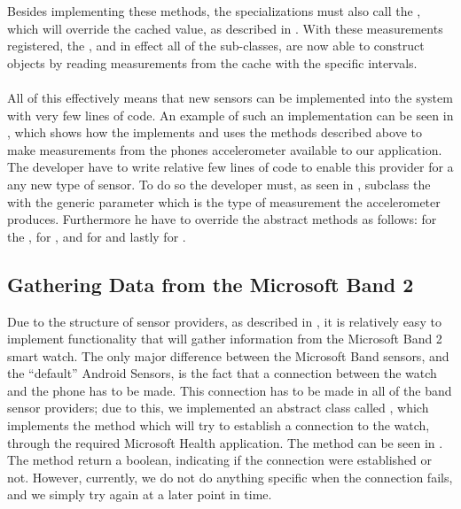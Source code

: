 Besides implementing these methods, the specializations must also call the , which will override the cached value, as described in . With these measurements registered, the , and in effect all of the sub-classes, are now able to construct  objects by reading measurements from the cache with the specific intervals. 
\\\\
All of this effectively means that new sensors can be implemented into the system with very few lines of code. An example of such an implementation can be seen in , which shows how the  implements and uses the methods described above to make measurements from the phones accelerometer available to our application. The developer have to write relative few lines of code to enable this provider for a any new type of sensor. To do so the developer must, as seen in , subclass the  with the generic parameter  which is the type of measurement the accelerometer produces. Furthermore he have to override the abstract methods as follows:  for the ,  for ,  and  for  and lastly  for .



\subsection{Gathering Data from the Microsoft Band 2}
Due to the structure of sensor providers, as described in , it is relatively easy to implement functionality that will gather information from the Microsoft Band 2 smart watch. The only major difference between the Microsoft Band sensors, and the ``default'' Android Sensors, is the fact that a connection between the watch and the phone has to be made. This connection has to be made in all of the band sensor providers; due to this, we implemented an abstract class called , which implements the method  which will try to establish a connection to the watch, through the required Microsoft Health application. The method can be seen in . The method return a boolean, indicating if the connection were established or not. However, currently, we do not do anything specific when the connection fails, and we simply try again at a later point in time.  

